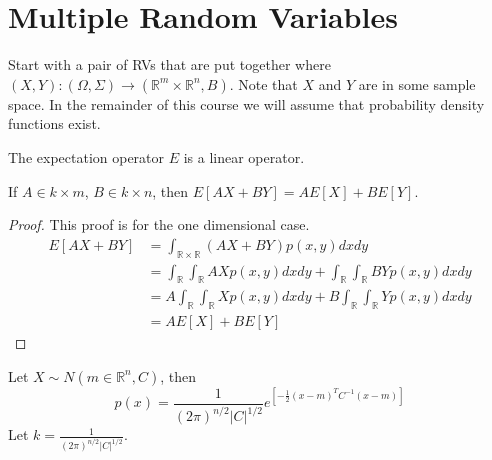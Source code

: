 
\mainmatter
\setcounter{page}{1}

\lectureseries[\course]{\course}

\date{October 1, 2009}

\setaddress

\setcounter{lecture}{1}
\setcounter{chapter}{1}


\section{Multiple Random Variables}
Start with a pair of RVs that are put together where $(X,Y):(\Omega,\Sigma) \to (\mathbb{R}^m\times \mathbb{R}^n,B)$. Note that $X$ and $Y$ are in some sample space. In the remainder of this course we will assume that probability density functions exist.

\begin{theorem}
\label{th:02expectationlo}
The expectation operator $E$ is a linear operator.

If $A\in k\times m$, $B\in k\times n$, then $E[AX+BY]=AE[X]+BE[Y]$.
\end{theorem}
\begin{proof}
This proof is for the one dimensional case.
\begin{align*}
E[AX+BY] &= \int_{\mathbb{R}\times\mathbb{R}}(AX+BY)p(x,y)dxdy \\
&= \int_{\mathbb{R}}\int_{\mathbb{R}}AXp(x,y)dxdy + \int_{\mathbb{R}}\int_{\mathbb{R}}BYp(x,y)dxdy \\
&= A\int_{\mathbb{R}}\int_{\mathbb{R}}Xp(x,y)dxdy + B\int_{\mathbb{R}}\int_{\mathbb{R}}Yp(x,y)dxdy \\
&= AE[X] + BE[Y]
\end{align*}
\end{proof}

Let $X\sim N(m\in\mathbb{R}^n,C)$, then
$$p(x)=\frac{1}{(2\pi)^{n/2}|C|^{1/2}}e^{\left[-\frac{1}{2}(x-m)^TC^{-1}(x-m)\right]}$$
Let $k=\frac{1}{(2\pi)^{n/2}|C|^{1/2}}$.

